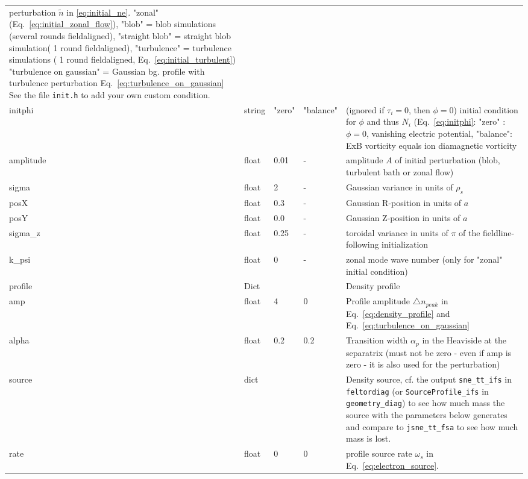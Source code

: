\begin{longtable}{llllp{6cm}}
perturbation $\tilde n$ in \eqref{eq:initial_ne}. "zonal" (Eq.~\eqref{eq:initial_zonal_flow}),
    "blob" = blob simulations (several rounds fieldaligned),
    "straight blob" = straight blob simulation( 1 round fieldaligned),
    "turbulence" = turbulence simulations ( 1 round fieldaligned, Eq.~\eqref{eq:initial_turbulent})
    "turbulence on gaussian" = Gaussian bg. profile with turbulence perturbation Eq.~\eqref{eq:turbulence_on_gaussian}
    See the file {\tt init.h} to add your own custom condition.
\\
initphi   & string & "zero"  & "balance" & (ignored if $\tau_i = 0$, then $\phi=0$) initial condition for $\phi$ and thus $N_i$ (Eq.~\eqref{eq:initphi}: "zero" : $\phi = 0$, vanishing
electric potential, "balance": ExB vorticity equals ion diamagnetic vorticity
\\
amplitude  & float &0.01   & - & amplitude $A$ of initial perturbation (blob, turbulent bath or zonal flow)  \\
sigma      & float &2      & - & Gaussian variance in units of $\rho_s$ \\
posX       & float &0.3    & - & Gaussian R-position in units of $a$\\
posY       & float &0.0    & - & Gaussian Z-position in units of $a$ \\
sigma\_z    & float &0.25   & - & toroidal variance in units of $\pi$ of the fieldline-following initialization \\
k\_psi     & float &0    & - & zonal mode wave number (only for "zonal" initial condition)  \\
profile & Dict & & & Density profile \\
\qquad amp& float &4   & 0 & Profile amplitude $\triangle n_{peak}$ in
Eq.~\eqref{eq:density_profile} and Eq.~\eqref{eq:turbulence_on_gaussian}
\\
\qquad alpha  & float & 0.2 & 0.2 & Transition width $\alpha_p$ in the Heaviside
at the separatrix (must not be zero - even if amp is zero - it is also used for the perturbation)
\\
source & dict & & & Density source, cf. the output \texttt{sne\_tt\_ifs} in \texttt{feltordiag} (or \texttt{SourceProfile\_ifs} in \texttt{geometry\_diag}) to see how much mass the source with the parameters below generates and compare to \texttt{jsne\_tt\_fsa} to see how much mass is lost.  \\
\qquad rate & float & 0    & 0 & profile source rate $\omega_s$ in Eq.~\eqref{eq:electron_source}.
\\

\end{longtable}
